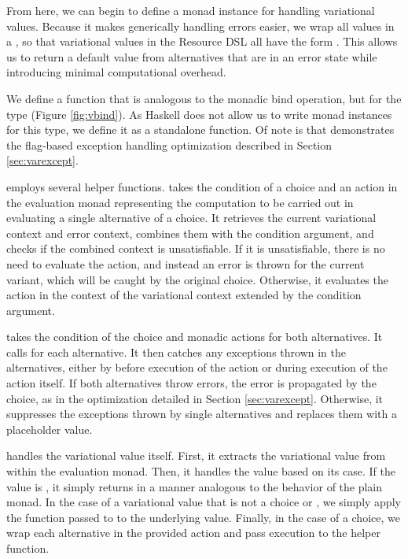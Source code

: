\documentclass[12pt,oneside]{book}
\begin{document}
From here, we can begin to define a monad instance for handling variational values.
Because it makes generically handling errors easier, we wrap all values in a ,
so that variational values in the Resource DSL all have the form . This
allows us to return a default value from alternatives that are in an error state while introducing minimal
computational overhead.

We define a function  that is analogous to the monadic bind operation, but for
the type  (Figure \ref{fig:vbind}). As Haskell does not allow us to write monad instances for this
type, we define it as a standalone function. Of note is that  demonstrates the flag-based exception handling optimization
described in Section \ref{sec:varexcept}.

 employs several helper functions.  takes the condition of a choice and an action in the evaluation monad representing the
computation to be carried out in evaluating a single alternative of a choice. It retrieves the current variational context and error context,
combines them with the condition argument,
and checks if the combined context is unsatisfiable. If it is unsatisfiable, there is no need to evaluate the action, and instead an error is
thrown for the current variant, which will be caught by the original choice. Otherwise, it evaluates the action in the context of
the variational context extended by the condition argument.

 takes the condition of the choice and monadic actions for both alternatives. It calls  for each alternative.
It then catches any exceptions thrown in the alternatives, either by  before execution of the action or during execution of the action
itself. If both alternatives throw errors, the error is propagated by the choice, as in the optimization detailed in Section \ref{sec:varexcept}. Otherwise,
it suppresses the exceptions thrown by single alternatives and replaces them with a placeholder  value.

 handles the variational value itself. First, it extracts the variational value from within the evaluation monad. Then, it handles
the value based on its case. If the value is , it simply returns  in a manner analogous to the behavior
of the plain  monad. In the case of a variational value that is not a choice or , we simply apply the function
passed to  to the underlying value. Finally, in the case of a choice, we wrap each alternative in the provided action
and pass execution to the  helper function.
\end{document}
